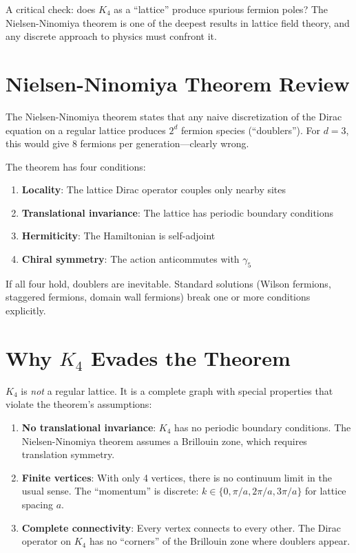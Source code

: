 \documentclass[11pt,a4paper]{book}
\begin{document}
A critical check: does $K_4$ as a ``lattice'' produce spurious fermion poles? The Nielsen-Ninomiya theorem is one of the deepest results in lattice field theory, and any discrete approach to physics must confront it.

\section{Nielsen-Ninomiya Theorem Review}

The Nielsen-Ninomiya theorem states that any naive discretization of the Dirac equation on a regular lattice produces $2^d$ fermion species (``doublers''). For $d = 3$, this would give 8 fermions per generation---clearly wrong.

The theorem has four conditions:
\begin{enumerate}
\item \textbf{Locality}: The lattice Dirac operator couples only nearby sites
\item \textbf{Translational invariance}: The lattice has periodic boundary conditions
\item \textbf{Hermiticity}: The Hamiltonian is self-adjoint
\item \textbf{Chiral symmetry}: The action anticommutes with $\gamma_5$
\end{enumerate}

If all four hold, doublers are inevitable. Standard solutions (Wilson fermions, staggered fermions, domain wall fermions) break one or more conditions explicitly.

\section{Why \texorpdfstring{$K_4$}{K4} Evades the Theorem}

$K_4$ is \emph{not} a regular lattice. It is a complete graph with special properties that violate the theorem's assumptions:

\begin{enumerate}
\item \textbf{No translational invariance}: $K_4$ has no periodic boundary conditions. The Nielsen-Ninomiya theorem assumes a Brillouin zone, which requires translation symmetry.

\item \textbf{Finite vertices}: With only 4 vertices, there is no continuum limit in the usual sense. The ``momentum'' is discrete: $k \in \{0, \pi/a, 2\pi/a, 3\pi/a\}$ for lattice spacing $a$.

\item \textbf{Complete connectivity}: Every vertex connects to every other. The Dirac operator on $K_4$ has no ``corners'' of the Brillouin zone where doublers appear.
\end{enumerate}
\end{document}

